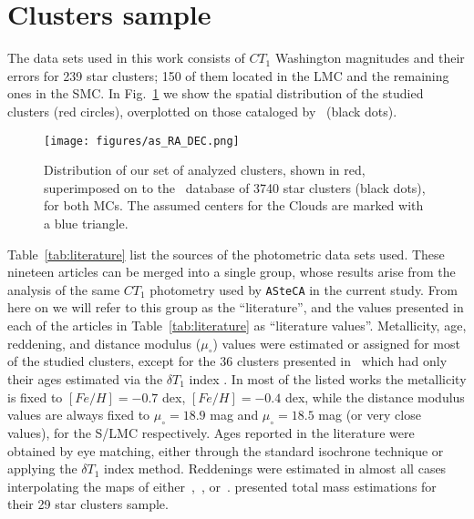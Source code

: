 \documentclass{aa}
\begin{document}

\section{Clusters sample}
\label{sec:clust-sample}

The data sets used in this work consists of $CT_1$ Washington magnitudes and
their errors for 239 star clusters; 150 of them located in the LMC and the
remaining ones in the SMC.\@
%
In Fig.~\ref{fig:ra-dec} we show the spatial distribution of the studied
clusters (red circles), overplotted on those cataloged by~\cite{Bica_2008} 
(black dots).

\begin{figure}
\centering
\texttt{[image: figures/as\_RA\_DEC.png]}
\caption{Distribution of our set of analyzed clusters, shown in red,
superimposed  on to the~\cite{Bica_2008} database of 3740 star clusters (black
dots), for both MCs. The assumed centers for the Clouds are marked with a blue
triangle.}
\label{fig:ra-dec}
\end{figure}

Table~\ref{tab:literature} list the sources of the photometric data sets used.
These nineteen articles can be merged into a single group, whose results
arise from the analysis of the same $CT_1$ photometry used by \texttt{ASteCA} in
the current study. From here on we will refer to this group as the
``literature'', and the values presented in each of the articles in
Table~\ref{tab:literature} as ``literature values''.
%
Metallicity, age, reddening, and distance modulus ($\mu_{\circ}$) values
were estimated or assigned for most of the studied clusters, except for the 36
clusters presented in~\cite{Piatti_2011b} which had only their ages estimated
via the $\delta T_1$ index \citep{Phelps_1994,Geisler_1997}.
In most of the listed works the metallicity is fixed to $[Fe/H]{=}-0.7$ dex,
$[Fe/H]{=}-0.4$ dex, while the distance modulus values are always fixed to
$\mu_{\circ}{=}18.9$ mag and $\mu_{\circ}{=}18.5$ mag (or very close values),
for the S/LMC respectively.
Ages reported in the literature were obtained by eye matching, either through
the standard isochrone technique or applying the $\delta T_1$ index method.
Reddenings were estimated in almost all cases interpolating the maps
of either~\cite{Burstein_1982},~\cite{Schlegel_1998}, or~\cite{Haschke_2011}.
%
\cite{Maia_2013} presented total mass estimations for their 29 star clusters
sample.
\end{document}
